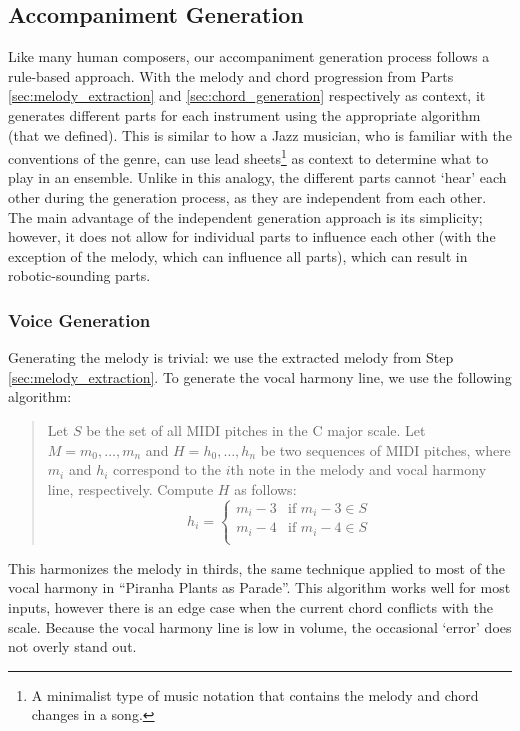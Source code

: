 \subsection{Accompaniment Generation}
\label{sec:accompaniment_generation}

Like many human composers, our accompaniment generation process follows a rule-based approach. With the melody and chord progression from Parts \ref{sec:melody_extraction} and \ref{sec:chord_generation} respectively as context, it generates different parts for each instrument using the appropriate algorithm (that we defined). This is similar to how a Jazz musician, who is familiar with the conventions of the genre, can use lead sheets\footnote{A minimalist type of music notation that contains the melody and chord changes in a song.} as context to determine what to play in an ensemble. Unlike in this analogy, the different parts cannot `hear' each other during the generation process, as they are independent from each other. The main advantage of the independent generation approach is its simplicity; however, it does not allow for individual parts to influence each other (with the exception of the melody, which can influence all parts), which can result in robotic-sounding parts.

\subsubsection{Voice Generation}

Generating the melody is trivial: we use the extracted melody from Step \ref{sec:melody_extraction}. To generate the vocal harmony line, we use the following algorithm:
\begin{quote}
    Let $S$ be the set of all MIDI pitches in the C major scale.
    Let $M = m_0, \ldots, m_n$ and $H = h_0, \ldots, h_n$ be two sequences of MIDI pitches, where $m_i$ and $h_i$ correspond to the $i$th note in the melody and vocal harmony line, respectively.
    Compute $H$ as follows:
    $$h_i = \begin{cases}
        m_i - 3 & \text{if }m_i - 3 \in S \\
        m_i - 4 & \text{if }m_i - 4 \in S \\
    \end{cases}$$
\end{quote}
This harmonizes the melody in thirds, the same technique applied to most of the vocal harmony in ``Piranha Plants as Parade''. This algorithm works well for most inputs, however there is an edge case when the current chord conflicts with the scale. Because the vocal harmony line is low in volume, the occasional `error' does not overly stand out.

